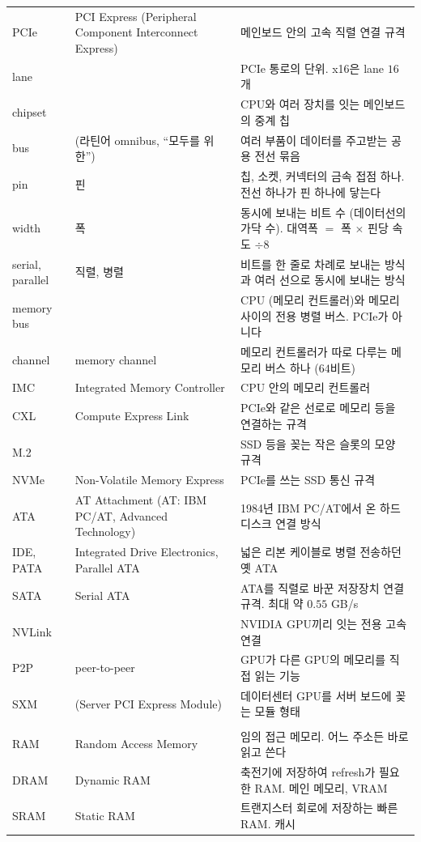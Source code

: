 \documentclass[11pt,a4paper]{article}
\begin{document}
{\begin{longtable}{@{}>{\raggedright\arraybackslash}p{24mm}>{\raggedright\arraybackslash}p{50mm}>{\raggedright\arraybackslash}p{76mm}@{}}
PCIe & PCI Express (Peripheral Component Interconnect Express) & 메인보드 안의 고속 직렬 연결 규격 \\
lane & & PCIe 통로의 단위. x16은 lane $16$개 \\
chipset & & CPU와 여러 장치를 잇는 메인보드의 중계 칩 \\
bus & (라틴어 omnibus, ``모두를 위한'') & 여러 부품이 데이터를 주고받는 공용 전선 묶음 \\
pin & 핀 & 칩, 소켓, 커넥터의 금속 접점 하나. 전선 하나가 핀 하나에 닿는다 \\
width & 폭 & 동시에 보내는 비트 수 (데이터선의 가닥 수). 대역폭 $=$ 폭 $\times$ 핀당 속도 $\div8$ \\
serial, parallel & 직렬, 병렬 & 비트를 한 줄로 차례로 보내는 방식과 여러 선으로 동시에 보내는 방식 \\
memory bus & & CPU (메모리 컨트롤러)와 메모리 사이의 전용 병렬 버스. PCIe가 아니다 \\
channel & memory channel & 메모리 컨트롤러가 따로 다루는 메모리 버스 하나 ($64$비트) \\
IMC & Integrated Memory Controller & CPU 안의 메모리 컨트롤러 \\
CXL & Compute Express Link & PCIe와 같은 선로로 메모리 등을 연결하는 규격 \\
M.2 & & SSD 등을 꽂는 작은 슬롯의 모양 규격 \\
NVMe & Non-Volatile Memory Express & PCIe를 쓰는 SSD 통신 규격 \\
ATA & AT Attachment (AT: IBM PC/AT, Advanced Technology) & 1984년 IBM PC/AT에서 온 하드디스크 연결 방식 \\
IDE, PATA & Integrated Drive Electronics, Parallel ATA & 넓은 리본 케이블로 병렬 전송하던 옛 ATA \\
SATA & Serial ATA & ATA를 직렬로 바꾼 저장장치 연결 규격. 최대 약 $0.55$ GB/s \\
NVLink & & NVIDIA GPU끼리 잇는 전용 고속 연결 \\
P2P & peer-to-peer & GPU가 다른 GPU의 메모리를 직접 읽는 기능 \\
SXM & (Server PCI Express Module) & 데이터센터 GPU를 서버 보드에 꽂는 모듈 형태 \\
\multicolumn{3}{@{}l}{\textbf{메모리}} \\
RAM & Random Access Memory & 임의 접근 메모리. 어느 주소든 바로 읽고 쓴다 \\
DRAM & Dynamic RAM & 축전기에 저장하여 refresh가 필요한 RAM. 메인 메모리, VRAM \\
SRAM & Static RAM & 트랜지스터 회로에 저장하는 빠른 RAM. 캐시 \\

\end{longtable}}
\end{document}
